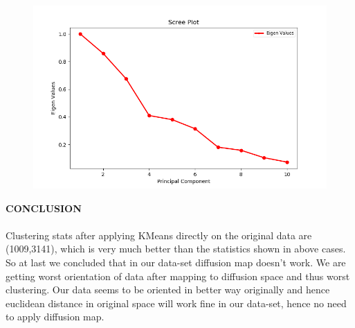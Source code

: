 \documentclass[12pt]{scrartcl}
\begin{document}
\begin{figure}[h]
    		
    		\includegraphics[scale=0.5]{2_20.png}
    		
\end{figure}
\newpage
{\Large{\textbf{CONCLUSION}}}\\\\
Clustering stats after applying KMeans directly on the original data are (1009,3141), which is very much better than the statistics shown in above cases.
So at last we concluded that in our data-set diffusion map doesn't work. We are getting worst orientation of data after mapping to diffusion space and thus worst clustering. Our data seems to be oriented in better way originally and hence euclidean distance in original space will work fine in our data-set, hence no need to apply diffusion map. 
\end{document}
